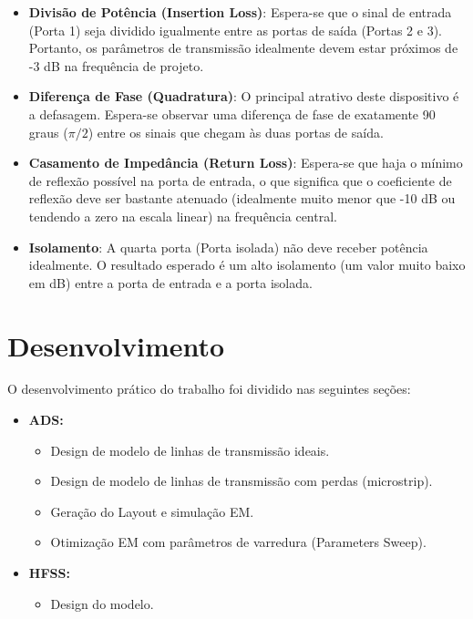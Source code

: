 \documentclass[article, oneside, oldfontcommands]{abntex2}
\begin{document}
\begin{itemize}
    \item \textbf{Divisão de Potência (Insertion Loss)}: Espera-se que o sinal de entrada (Porta 1) seja dividido igualmente entre as portas de saída (Portas 2 e 3). Portanto, os parâmetros de transmissão idealmente devem estar próximos de -3 dB na frequência de projeto.
    \item \textbf{Diferença de Fase (Quadratura)}: O principal atrativo deste dispositivo é a defasagem. Espera-se observar uma diferença de fase de exatamente 90 graus ($\pi/2$) entre os sinais que chegam às duas portas de saída.
    \item \textbf{Casamento de Impedância (Return Loss)}: Espera-se que haja o mínimo de reflexão possível na porta de entrada, o que significa que o coeficiente de reflexão deve ser bastante atenuado (idealmente muito menor que -10 dB ou tendendo a zero na escala linear) na frequência central.
    \item \textbf{Isolamento}: A quarta porta (Porta isolada) não deve receber potência idealmente. O resultado esperado é um alto isolamento (um valor muito baixo em dB) entre a porta de entrada e a porta isolada.
\end{itemize}

\section{Desenvolvimento}

O desenvolvimento prático do trabalho foi dividido nas seguintes seções:
\begin{itemize}
    \item \textbf{\boldmath ADS:}
    \begin{itemize}
        \item Design de modelo de linhas de transmissão ideais.
        \item Design de modelo de linhas de transmissão com perdas (microstrip).
        \item Geração do Layout e simulação EM.
        \item Otimização EM com parâmetros de varredura (Parameters Sweep).
    \end{itemize}
    \item \textbf{\boldmath HFSS:}
    \begin{itemize}
        \item Design do modelo.
    \end{itemize}
\end{itemize}
\end{document}
